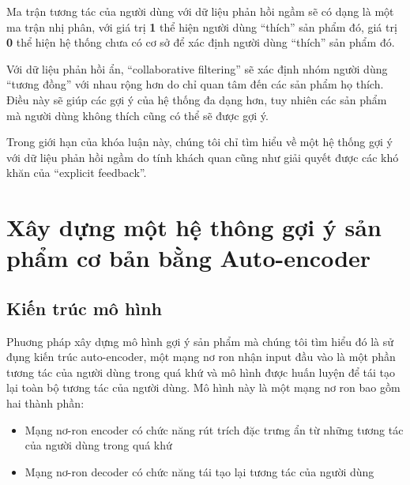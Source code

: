     Ma trận tương tác của người dùng với dữ liệu phản hồi ngầm sẽ có dạng là một ma trận nhị phân, với giá trị \textbf{1} 
    thể hiện người dùng ``thích'' sản phẩm đó, giá trị \textbf{0} thể hiện hệ thống chưa có cơ sở để xác định người dùng ``thích'' sản phẩm đó.

    Với dữ liệu phản hồi ẩn, ``collaborative filtering'' sẽ xác định nhóm người dùng ``tương đồng'' với nhau rộng hơn
    do chỉ quan tâm đến các sản phẩm họ thích. Điều này sẽ giúp các gợi ý của hệ thống 
    đa dạng hơn, tuy nhiên các sản phẩm mà người dùng không thích cũng có thể sẽ được gợi ý.

    Trong giới hạn của khóa luận này, chúng tôi chỉ tìm hiểu về một hệ thống gợi ý với dữ liệu phản hồi ngầm do tính khách quan
    cũng như giải quyết được các khó khăn của ``explicit feedback''.

\section{Xây dựng một hệ thông gợi ý sản phẩm cơ bản bằng Auto-encoder}
    \subsection{Kiến trúc mô hình}
    \label{chap3/sec11}
    Phuơng pháp xây dựng mô hình gợi ý sản phẩm mà chúng tôi tìm hiểu đó là sử đụng kiến trúc auto-encoder, một mạng nơ ron nhận input đầu vào là một phần tương tác của người dùng trong quá khứ và mô hình được huấn luyện để tái tạo lại toàn bộ tương tác của người dùng.  Mô hình này là một mạng nơ ron bao gồm hai thành phần:
    \begin{itemize}
        \item Mạng nơ-ron encoder có chức năng rút trích đặc trưng ẩn từ những tương tác của người dùng trong quá khứ
        \item Mạng nơ-ron decoder có chức năng tái tạo lại tương tác của người dùng
    \end{itemize}


